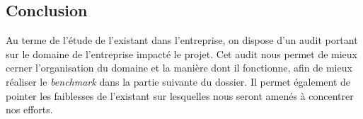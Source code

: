 \subsection{Conclusion}

Au terme de l'étude de l'existant dans l'entreprise, on dispose d'un audit
portant sur le domaine de l'entreprise impacté le projet. Cet audit nous
permet de mieux cerner l'organisation du domaine et la manière dont il
fonctionne, afin de mieux réaliser le {\sl benchmark} dans la partie
suivante du dossier. Il permet également de pointer les faiblesses de
l'existant sur lesquelles nous seront amenés à concentrer nos efforts.
